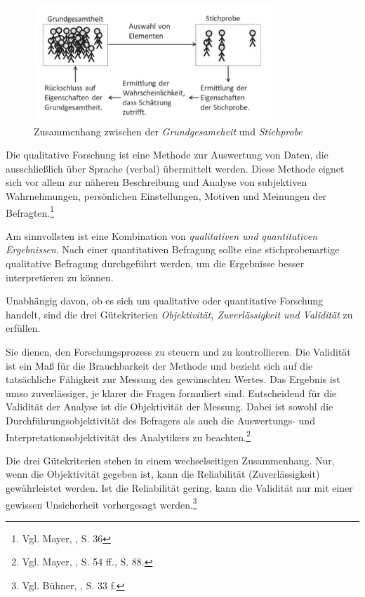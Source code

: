 \begin{figure}
    \centering
    \includegraphics[width=0.80\textwidth]{images/zsmhGrundStich}
    \caption{Zusammenhang zwischen der \textit{Grundgesameheit} und \textit{Stichprobe}\protect\footnotemark}
    \label{fig:GrundgesamtheitStichprobe}
\end{figure}

Die qualitative Forschung ist eine Methode zur Auswertung von Daten, die ausschließlich über Sprache (verbal) übermittelt
werden. Diese Methode eignet sich vor allem zur näheren Beschreibung und Analyse von subjektiven Wahrnehmungen, persönlichen
Einstellungen, Motiven und Meinungen der Befragten.\footnote{Vgl. Mayer, \cite{Interview und schriftliche Befragung}, S. 36}

Am sinnvollsten ist eine Kombination von \textit{qualitativen und quantitativen Ergebnissen}. Nach einer quantitativen
Befragung sollte eine stichprobenartige qualitative Befragung durchgeführt werden, um die Ergebnisse besser interpretieren zu können.

Unabhängig davon, ob es sich um qualitative oder quantitative Forschung handelt, sind die drei Gütekriterien \textit{Objektivität,
Zuverlässigkeit und Validität} zu erfüllen.

Sie dienen, den Forschungsprozess zu steuern und zu kontrollieren. Die Validität ist ein Maß für die Brauchbarkeit der
Methode und bezieht sich auf die tatsächliche Fähigkeit zur Messung des gewünschten Wertes. Das Ergebnis ist umso zuverlässiger,
je klarer die Fragen formuliert sind. Entscheidend für die Validität der Analyse ist die Objektivität der Messung. Dabei
ist sowohl die Durchführungsobjektivität des Befragers als auch die Auswertungs- und Interpretationsobjektivität des
Analytikers zu beachten.\footnote{Vgl. Mayer, \cite{Interview und schriftliche Befragung}, S. 54 ff., S. 88.}

Die drei Gütekriterien stehen in einem wechselseitigen Zusammenhang. Nur, wenn die Objektivität gegeben ist, kann die
Reliabilität (Zuverlässigkeit) gewährleistet werden. Ist die Reliabilität gering, kann die Validität nur mit einer gewissen Unsicherheit
vorhergesagt werden.\footnote{Vgl. Bühner, \cite{Einfuehrung in die Test- und Fragebogenkonstruktion}, S. 33 f.}

